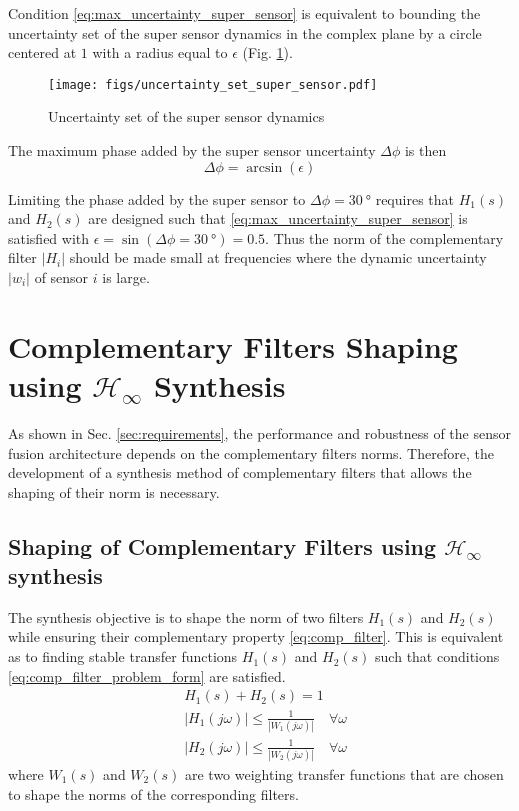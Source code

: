 \documentclass[letterpaper, 10 pt, conference]{ieeeconf}
\begin{document}
Condition \eqref{eq:max_uncertainty_super_sensor} is equivalent to bounding the uncertainty set of the super sensor dynamics in the complex plane by a circle centered at \(1\) with a radius equal to \(\epsilon\) (Fig. \ref{fig:uncertainty_set_super_sensor}).

\begin{figure}[htbp]
\centering
\texttt{[image: figs/uncertainty\_set\_super\_sensor.pdf]}
\caption{\label{fig:uncertainty_set_super_sensor}
Uncertainty set of the super sensor dynamics}
\end{figure}

The maximum phase added by the super sensor uncertainty \(\Delta\phi\) is then
\begin{equation}
\label{eq:max_phase_uncertainty}
    \Delta \phi = \arcsin\left( \epsilon \right)
\end{equation}

Limiting the phase added by the super sensor to \(\Delta \phi = \SI{30}{\degree}\) requires that \(H_1(s)\) and \(H_2(s)\) are designed such that \eqref{eq:max_uncertainty_super_sensor} is satisfied with \(\epsilon = \sin(\Delta\phi = \SI{30}{\degree}) = 0.5\).
Thus the norm of the complementary filter \(|H_i|\) should be made small at frequencies where the dynamic uncertainty \(|w_i|\) of sensor \(i\) is large.

\section{Complementary Filters Shaping using \(\mathcal{H}_\infty\) Synthesis}
\label{sec:org8eb875c}
\label{sec:hinf_method}
As shown in Sec. \ref{sec:requirements}, the performance and robustness of the sensor fusion architecture depends on the complementary filters norms.
Therefore, the development of a synthesis method of complementary filters that allows the shaping of their norm is necessary.
\subsection{Shaping of Complementary Filters using \(\mathcal{H}_\infty\) synthesis}
\label{sec:orga1b497a}
\label{sec:hinf_synthesis}
The synthesis objective is to shape the norm of two filters \(H_1(s)\) and \(H_2(s)\) while ensuring their complementary property \eqref{eq:comp_filter}.
This is equivalent as to finding stable transfer functions \(H_1(s)\) and \(H_2(s)\) such that conditions \eqref{eq:comp_filter_problem_form} are satisfied.
\begin{subequations}
\label{eq:comp_filter_problem_form}
  \begin{align}
  & H_1(s) + H_2(s) = 1 \label{eq:hinf_cond_complementarity} \\
  & |H_1(j\omega)| \le \frac{1}{|W_1(j\omega)|} \quad \forall\omega \label{eq:hinf_cond_h1} \\
  & |H_2(j\omega)| \le \frac{1}{|W_2(j\omega)|} \quad \forall\omega \label{eq:hinf_cond_h2}
  \end{align}
\end{subequations}
where \(W_1(s)\) and \(W_2(s)\) are two weighting transfer functions that are chosen to shape the norms of the corresponding filters.
\end{document}
